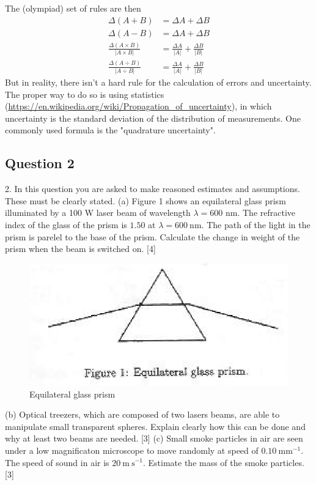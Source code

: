 \documentclass{article}
\begin{document}
The (olympiad) set of rules are then
\begin{align}
	\Delta(A+B) &= \Delta A + \Delta B \\
	\Delta(A-B) &= \Delta A + \Delta B \\
	\frac{\Delta (A\times B)}{|A\times B|} &= \frac{\Delta A}{|A|} + \frac{\Delta B}{|B|} \\
	\frac{\Delta (A\div B)}{|A\div B|} &= \frac{\Delta A}{|A|} + \frac{\Delta B}{|B|}
\end{align}
But in reality, there isn't a hard rule for the calculation of errors and uncertainty. The proper way to do so is using statistics (\url{https://en.wikipedia.org/wiki/Propagation_of_uncertainty}), in which uncertainty is the standard deviation of the distribution of measurements. One commonly used formula is the "quadrature uncertainty".

\subsection{Question 2}
2. In this question you are asked to make reasoned estimates and assumptions. These must be clearly stated.
(a) Figure 1 shows an equilateral glass prism illuminated by a 100 W laser beam of wavelength $\lambda=600$ nm. The refractive index of the glass of the prism is $1.50$ at $\lambda=600 \mathrm{~nm}$. The path of the light in the prism is parelel to the base of the prism. Calculate the change in weight of the prism when the beam is switched on. [4]
\begin{figure}
	\centering
	\includegraphics[width=0.8\linewidth]{spho_book_TYS_images/2011q2.png}
	\caption{Equilateral glass prism}
\end{figure}
(b) Optical treezers, which are composed of two lasers beams, are able to manipulate small transparent spheres. Explain clearly how this can be done and why at least two beams are needed. [3]
(c) Small smoke particles in air are seen under a low magnificaton microscope to move randomly at speed of $0.10 \mathrm{~mm}^{-1}$. The speed of sound in air is $20 \mathrm{~m} \mathrm{~s}^{-1}$. Estimate the mass of the smoke particles. [3]
\end{document}
